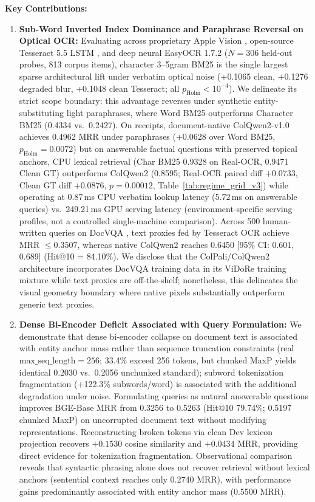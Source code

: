 \textbf{Key Contributions:}
\begin{enumerate}
    \setlength{\itemsep}{0.2pt plus 0.1pt}
    \setlength{\parskip}{0pt}
    \item \textbf{Sub-Word Inverted Index Dominance and Paraphrase Reversal on Optical OCR:} Evaluating across proprietary Apple Vision \cite{apple2020vision}, open-source Tesseract 5.5 LSTM \cite{smith2007tesseract}, and deep neural EasyOCR 1.7.2 \cite{jaidedai2020easyocr} ($N=306$ held-out probes, 813 corpus items), character 3--5gram BM25 is the single largest sparse architectural lift under verbatim optical noise (+0.1065 clean, +0.1276 degraded blur, +0.1048 clean Tesseract; all $p_{\text{Holm}} < 10^{-4}$). We delineate its strict scope boundary: this advantage reverses under synthetic entity-substituting light paraphrases, where Word BM25 outperforms Character BM25 (0.4334 vs.\ 0.2427). On receipts, document-native ColQwen2-v1.0 \cite{faysse2024colqwen2} achieves 0.4962 MRR under paraphrases (+0.0628 over Word BM25, $p_{\text{Holm}} = 0.0072$) but on answerable factual questions with preserved topical anchors, CPU lexical retrieval (Char BM25 0.9328 on Real-OCR, 0.9471 Clean GT) outperforms ColQwen2 (0.8595; Real-OCR paired diff $+0.0733$, Clean GT diff $+0.0876$, $p = 0.00012$, Table~\ref{tab:regime_grid_v3}) while operating at 0.87\,ms CPU verbatim lookup latency (5.72\,ms on answerable queries) vs.\ 249.21\,ms GPU serving latency (environment-specific serving profiles, not a controlled single-machine comparison). Across 500 human-written queries on DocVQA \cite{mathew2021docvqa}, text proxies fed by Tesseract OCR achieve MRR $\le 0.3507$, whereas native ColQwen2 reaches 0.6450 [95\% CI: 0.601, 0.689] (Hit@10 = 84.10\%). We disclose that the ColPali/ColQwen2 architecture incorporates DocVQA training data in its ViDoRe training mixture while text proxies are off-the-shelf; nonetheless, this delineates the visual geometry boundary where native pixels substantially outperform generic text proxies.
    \item \textbf{Dense Bi-Encoder Deficit Associated with Query Formulation:} We demonstrate that dense bi-encoder collapse on document text is associated with entity anchor mass rather than sequence truncation constraints (real $\text{max\_seq\_length}=256$; 33.4\% exceed 256 tokens, but chunked MaxP yields identical 0.2030 vs.\ 0.2056 unchunked standard); subword tokenization fragmentation (+122.3\% subwords/word) is associated with the additional degradation under noise. Formulating queries as natural answerable questions improves BGE-Base MRR from 0.3256 to 0.5263 (Hit@10 79.74\%; 0.5197 chunked MaxP) on uncorrupted document text without modifying representations. Reconstructing broken tokens via clean Dev lexicon projection recovers $+0.1530$ cosine similarity and $+0.0434$ MRR, providing direct evidence for tokenization fragmentation. Observational comparison reveals that syntactic phrasing alone does not recover retrieval without lexical anchors (sentential context reaches only 0.2740 MRR), with performance gains predominantly associated with entity anchor mass (0.5500 MRR).

\end{enumerate}
